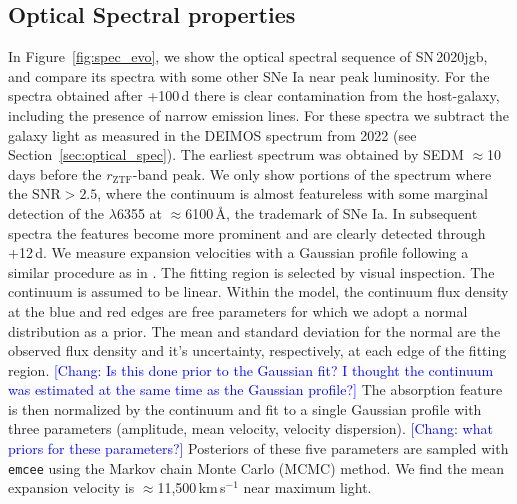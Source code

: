 \documentclass[twocolumn]{aastex631}
\newcommand{\sn}{SN\,2020jgb}
\newcommand{\chang}[1]{\textcolor{blue}{[Chang: #1]}}
\begin{document}
\subsection{Optical Spectral properties}
In Figure~\ref{fig:spec_evo}, we show the optical spectral sequence of \sn, and compare its spectra with some other SNe Ia near peak luminosity. For the spectra obtained after +100\,d there is clear contamination from the host-galaxy, including the presence of narrow emission lines. For these spectra we subtract the galaxy light as measured in the DEIMOS spectrum from 2022 (see Section~\ref{sec:optical_spec}). The earliest spectrum was obtained by SEDM $\approx$10\,days before the $r_\mathrm{ZTF}$-band peak. We only show portions of the spectrum where the $\mathrm{SNR}>2.5$, where the continuum is almost featureless with some marginal detection of the  $\lambda$6355 at $\approx$6100\,\r{A}, the trademark of SNe Ia. In subsequent spectra the  features become more prominent and are clearly detected through +12\,d. We measure  expansion velocities with a Gaussian profile following a similar procedure as in \citet{Maguire_2014}. The fitting region is selected by visual inspection. The continuum is assumed to be linear. Within the model, the continuum flux density at the blue and red edges are free parameters for which we adopt a normal distribution as a prior. The mean and standard deviation for the normal are the observed flux density and it's uncertainty, respectively, at each edge of the fitting region. \chang{Is this done prior to the Gaussian fit? I thought the continuum was estimated at the same time as the Gaussian profile?} The absorption feature is then normalized by the continuum and fit to a single Gaussian profile with three parameters (amplitude, mean velocity, velocity dispersion). \chang{what priors for these parameters?} Posteriors of these five parameters are sampled with \texttt{emcee} \citep{emcee_2013} using the Markov chain Monte Carlo (MCMC) method. We find the mean expansion velocity is $\approx$11,500\,km\,s$^{-1}$ near maximum light.
\end{document}
